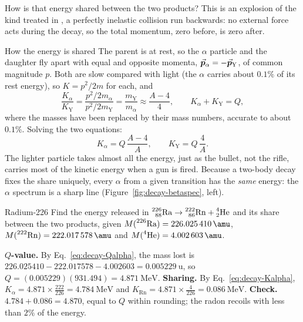 How is that energy shared between the two products? This is an explosion of the kind treated in
, a perfectly inelastic collision run backwards: no external force acts during the
decay, so the total momentum, zero before, is zero after.

\begin{derivbox}{How the energy is shared}
The parent is at rest, so the $\alpha$ particle and the daughter fly apart with equal and opposite
momenta, $\vec{\bm{p}}_\alpha=-\vec{\bm{p}}_{\mathrm{Y}}$, of common magnitude $p$. Both are slow compared with light (the
$\alpha$ carries about $0.1\%$ of its rest energy), so $K=p^2/2m$ for each, and
\[
\frac{K_\alpha}{K_{\mathrm{Y}}}=\frac{p^2/2m_\alpha}{p^2/2m_{\mathrm{Y}}}=\frac{m_{\mathrm{Y}}}{m_\alpha}\approx\frac{A-4}{4},
\qquad K_\alpha+K_{\mathrm{Y}}=Q,
\]
where the masses have been replaced by their mass numbers, accurate to about $0.1\%$. Solving the two
equations:
\begin{equation}\label{eq:decay-Kalpha}
\boxed{\;K_\alpha=Q\,\frac{A-4}{A},\qquad K_{\mathrm{Y}}=Q\,\frac{4}{A}.\;}
\end{equation}
The lighter particle takes almost all the energy, just as the bullet, not the rifle, carries most of the
kinetic energy when a gun is fired. Because a two-body decay fixes the share uniquely, every $\alpha$ from
a given transition has the \emph{same} energy: the $\alpha$ spectrum is a sharp line
(Figure~\ref{fig:decay-betaspec}, left).
\end{derivbox}

\begin{exbox}{Radium-226}\label{ex:decay-ra226}
Find the energy released in $\prescript{226}{88}{\mathrm{Ra}}\to\prescript{222}{86}{\mathrm{Rn}}+\prescript{4}{2}{\mathrm{He}}$ and its share between the two
products, given $M(\iso{226}{Ra})=\SI{226.025410}{\amu}$, $M(\iso{222}{Rn})=\SI{222.017578}{\amu}$ and
$M(\iso4{He})=\SI{4.002603}{\amu}$.

 \textbf{$Q$-value.} By Eq.~\eqref{eq:decay-Qalpha}, the mass lost is
$226.025410-222.017578-4.002603=\SI{0.005229}{\amu}$, so $Q=(0.005229)(931.494)=\SI{4.871}{\MeV}$.
 \textbf{Sharing.} By Eq.~\eqref{eq:decay-Kalpha}, $K_\alpha=4.871\times\tfrac{222}{226}=\SI{4.784}{\MeV}$
and $K_{\mathrm{Rn}}=4.871\times\tfrac{4}{226}=\SI{0.086}{\MeV}$.
 \textbf{Check.} $4.784+0.086=4.870$, equal to $Q$ within rounding; the radon recoils with less
than $2\%$ of the energy. 
\end{exbox}

